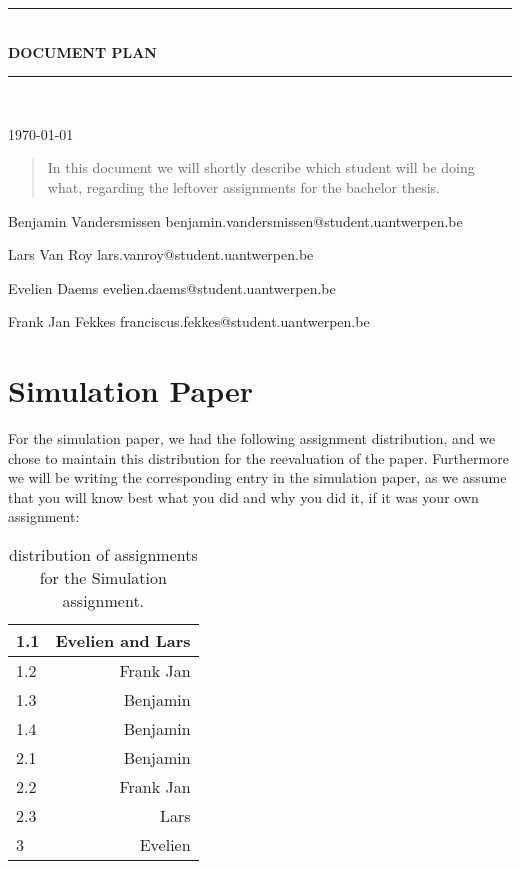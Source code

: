 \documentclass{article}
\newcommand{\HRule}[1]{\rule{\linewidth}{#1}}
\begin{document}
\begin{titlepage}
	\begin{center}
		\HRule{0.5pt} \\
		\LARGE \textbf{\uppercase{Document plan}}
		\HRule{2pt} \\ [0.5cm]
		{\normalsize \today \par}
		\vspace{2cm}
		\begin{abstract}
			\noindent
			In this document we will shortly describe which student will be doing what, regarding the leftover assignments for the bachelor thesis.
			
		\end{abstract}
		\vfill
		\vfill
		{\normalsize Benjamin Vandersmissen \scriptsize benjamin.vandersmissen@student.uantwerpen.be \par}
		{\normalsize Lars Van Roy \scriptsize lars.vanroy@student.uantwerpen.be \par}
		{\normalsize Evelien Daems \scriptsize evelien.daems@student.uantwerpen.be \par}
		{\normalsize Frank Jan Fekkes \scriptsize franciscus.fekkes@student.uantwerpen.be \par}
	\end{center}
	
	\vfill
	
	\date{}
	
	\author{}
\end{titlepage}

\newpage

\tableofcontents

\newpage

\section{Simulation Paper}
For the simulation paper, we had the following assignment distribution, and we chose to maintain this distribution for the reevaluation of the paper. Furthermore we will be writing the corresponding entry in the simulation paper, as we assume that you will know best what you did and why you did it, if it was your own assignment: \\
\begin{table}[h!]
\centering
\begin{tabular}{| l | r |}
	\hline
	1.1 & Evelien and Lars \\
	\hline
	1.2 & Frank Jan \\
	\hline
	1.3 & Benjamin \\
	\hline
	1.4 & Benjamin \\
	\hline
	2.1 & Benjamin \\
	\hline
	2.2 & Frank Jan \\
	\hline
	2.3 & Lars \\
	\hline
	3 & Evelien \\
	\hline
\end{tabular}
\caption{distribution of assignments for the Simulation assignment.}
\end{table}
\end{document}
